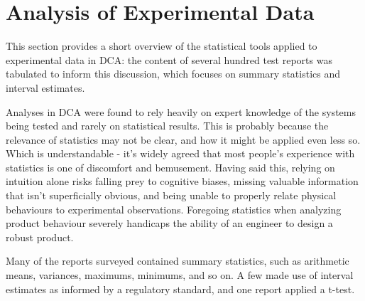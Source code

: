 \documentclass[11pt,a4paper,article]{memoir} %
\begin{document}
\section{Analysis of Experimental Data}
This section provides a short overview of the statistical tools applied to experimental data in DCA: the content of several hundred test reports was tabulated to inform this discussion, which focuses on summary statistics and interval estimates.
\par
Analyses in DCA were found to rely heavily on expert knowledge of the systems being tested and rarely on statistical results. This is probably because the relevance of statistics may not be clear, and how it might be applied even less so. Which is understandable - it's widely agreed that most people's experience with statistics is one of discomfort and bemusement. Having said this, relying on intuition alone risks falling prey to cognitive biases, missing valuable information that isn't superficially obvious, and being unable to properly relate physical behaviours to experimental observations. Foregoing statistics when analyzing product behaviour severely handicaps the ability of an engineer to design a robust product.
\par
Many of the reports surveyed contained summary statistics, such as arithmetic means, variances, maximums, minimums, and so on. A few made use of interval estimates as informed by a regulatory standard, and one report applied a t-test.
\par
\end{document}
